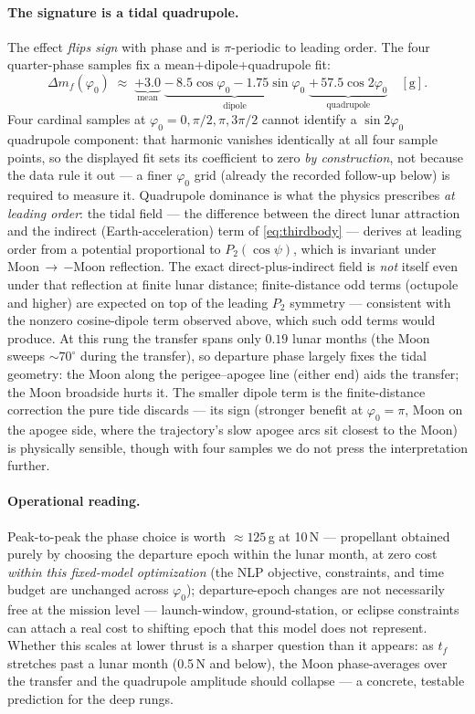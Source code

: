 \documentclass[11pt]{article}
\begin{document}
\paragraph{The signature is a tidal quadrupole.}
The effect \emph{flips sign} with phase and is $\pi$-periodic to leading
order. The four quarter-phase samples fix a mean+dipole+quadrupole fit:
\[
\Delta m_f(\varphi_0) \;\approx\;
\underbrace{+3.0}_{\text{mean}}
\;\underbrace{-\,8.5\cos\varphi_0 - 1.75\sin\varphi_0}_{\text{dipole}}
\;\underbrace{+\,57.5\cos 2\varphi_0}_{\text{quadrupole}}
\quad[\mathrm{g}].
\]
Four cardinal samples at $\varphi_0 = 0, \pi/2, \pi, 3\pi/2$ cannot identify
a $\sin 2\varphi_0$ quadrupole component: that harmonic vanishes identically
at all four sample points, so the displayed fit sets its coefficient to
zero \emph{by construction}, not because the data rule it out --- a finer
$\varphi_0$ grid (already the recorded follow-up below) is required to
measure it. Quadrupole dominance is what the physics prescribes \emph{at
leading order}: the tidal field --- the difference between the direct
lunar attraction and the indirect (Earth-acceleration) term of
\eqref{eq:thirdbody} --- derives at leading order from a potential
proportional to $P_2(\cos\psi)$, which is invariant under Moon\,$\to$\,$-$Moon
reflection. The exact direct-plus-indirect field is \emph{not} itself even
under that reflection at finite lunar distance; finite-distance odd terms
(octupole and higher) are expected on top of the leading $P_2$ symmetry ---
consistent with the nonzero cosine-dipole term observed above, which such
odd terms would produce. At this rung the transfer spans only
$0.19$ lunar months (the Moon sweeps $\sim 70^\circ$ during the transfer),
so departure phase largely fixes the tidal geometry: the Moon along the
perigee--apogee line (either end) aids the transfer; the Moon broadside
hurts it. The smaller dipole term is the finite-distance correction the
pure tide discards --- its sign (stronger benefit at $\varphi_0 = \pi$,
Moon on the apogee side, where the trajectory's slow apogee arcs sit
closest to the Moon) is physically sensible, though with four samples we
do not press the interpretation further.

\paragraph{Operational reading.}
Peak-to-peak the phase choice is worth $\approx 125$\,g at 10\,N ---
propellant obtained purely by choosing the departure epoch within the lunar
month, at zero cost \emph{within this fixed-model optimization} (the NLP
objective, constraints, and time budget are unchanged across $\varphi_0$);
departure-epoch changes are not necessarily free at the mission level ---
launch-window, ground-station, or eclipse constraints can attach a real
cost to shifting epoch that this model does not represent. Whether this
scales at lower
thrust is a sharper question than it appears: as $t_f$ stretches past a
lunar month (0.5\,N and below), the Moon phase-averages over the transfer
and the quadrupole amplitude should collapse --- a concrete, testable
prediction for the deep rungs.
\end{document}

